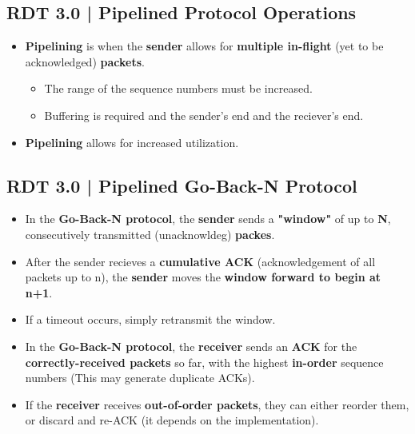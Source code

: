 \documentclass{article}
\begin{document}
    \subsection*{RDT 3.0 | Pipelined Protocol Operations}
    \begin{itemize}
        \item \textbf{Pipelining} is when the \textbf{sender} allows for \textbf{multiple in-flight} (yet to be acknowledged) \textbf{packets}.
        \begin{itemize}
            \item The range of the sequence numbers must be increased.
            \item Buffering is required and the sender's end and the reciever's end.
        \end{itemize}
        \item \textbf{Pipelining} allows for increased utilization.
    \end{itemize}

    \subsection*{RDT 3.0 | Pipelined Go-Back-N Protocol}
    \begin{itemize}
        \item In the \textbf{Go-Back-N protocol}, the \textbf{sender} sends a \textbf{"window"} of up to \textbf{N}, consecutively transmitted (unacknowldeg) \textbf{packes}.
        \item After the sender recieves a \textbf{cumulative ACK} (acknowledgement of all packets up to n), the \textbf{sender} moves the \textbf{window forward to begin at n+1}.
        \item If a timeout occurs, simply retransmit the window.
        \item In the \textbf{Go-Back-N protocol}, the \textbf{receiver} sends an \textbf{ACK} for the \textbf{correctly-received packets} so far, with the highest \textbf{in-order} sequence numbers (This may generate duplicate ACKs).
        \item If the \textbf{receiver} receives \textbf{out-of-order packets}, they can either reorder them, or discard and re-ACK (it depends on the implementation).
    \end{itemize}
\end{document}
